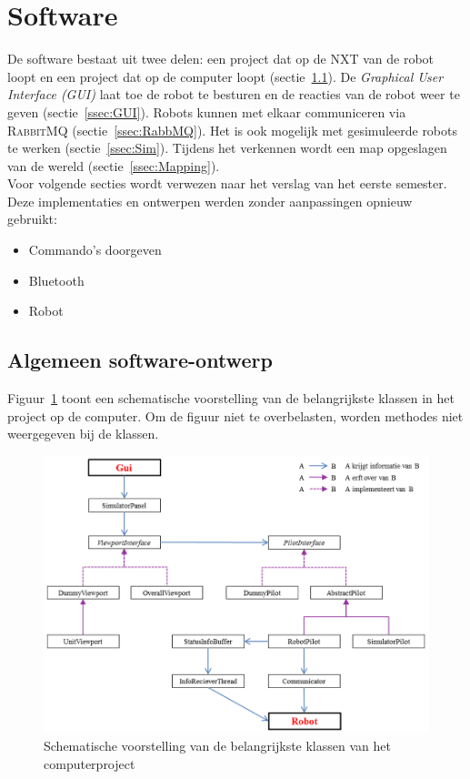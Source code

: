 \documentclass[eind]{penoverslag}
\begin{document}
\section{Software}
\label{sec:Softw}
De software bestaat uit twee delen: een project dat op de \textsc{NXT} van de robot loopt en een project dat op de computer loopt (sectie~\ref{ssec:Sdesign}). De \textit{Graphical User Interface (GUI)} laat toe de robot te besturen en de reacties van de robot weer te geven (sectie~\ref{ssec:GUI}). Robots kunnen met elkaar communiceren via \textsc{RabbitMQ} (sectie~\ref{ssec:RabbMQ}). Het is ook mogelijk met gesimuleerde robots te werken (sectie~\ref{ssec:Sim}). Tijdens het verkennen wordt een map opgeslagen van de wereld (sectie~\ref{ssec:Mapping}).\\

Voor volgende secties wordt verwezen naar het verslag van het eerste semester. Deze implementaties en ontwerpen werden zonder aanpassingen opnieuw gebruikt:

\begin{itemize}
\item Commando's doorgeven
\item Bluetooth
\item Robot
\end{itemize}

\subsection{Algemeen software-ontwerp}
\label{ssec:Sdesign}
Figuur~\ref{fig:klasSoft} toont een schematische voorstelling van de belangrijkste klassen in het project op de computer. Om de figuur niet te overbelasten, worden methodes niet weergegeven bij de klassen.\\

\begin{figure}[h]
\centering
		\includegraphics[width=\textwidth]{KlasSoftware}
\caption[Structuur van computerproject]{Schematische voorstelling van de belangrijkste klassen van het computerproject}
\label{fig:klasSoft}
\end{figure}
\end{document}
